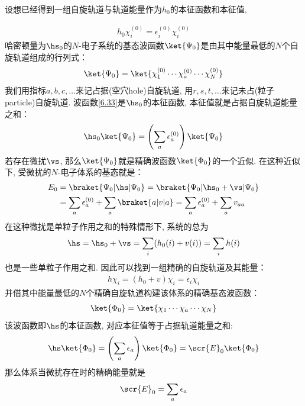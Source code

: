 设想已经得到一组自旋轨道与轨道能量作为$h_0$的本征函数和本征值,

\begin{align}
h_0\chi_i^{(0)} = \epsilon_i^{(0)} \chi_i^{(0)}
\end{align}
哈密顿量为$\hs_0$的$N$-电子系统的基态波函数$\ket{\Psi_0}$是由其中能量最低的$N$个自旋轨道组成的行列式：
\begin{align}\label{6.33}
\ket{\Psi_0} = \ket{\chi_1^{(0)}\cdots\chi_a^{(0)}\cdots\chi_N^{(0)}}
\end{align}
我们用指标$a,b,c,\ldots$来记占据(空穴hole)自旋轨道, 
用$r,s,t,\ldots$来记未占(粒子particle)自旋轨道. 
波函数\autoref{6.33}是$\hs_0$的本征函数, 
本征值就是占据自旋轨道能量之和：
\begin{align*}
\hs_0\ket{\Psi_0} = \left( \sum_a\epsilon_a^{(0)} \right)\ket{\Psi_0}
\end{align*}
若存在微扰$\vs$, 
那么$\ket{\Psi_0}$就是精确波函数$\ket{\Phi_0}$的一个近似. 
在这种近似下, 
受微扰的$N$-电子体系的基态就是：
\begin{align}\label{6.34}
E_0 & = \braket{\Psi_0|\hs|\Psi_0} = \braket{\Psi_0|\hs_0+\vs|\Psi_0}\notag\\
    & = \sum_a\epsilon_a^{(0)} + \sum_a\braket{a|v|a} = \sum_a\epsilon_a^{(0)} + \sum_av_{aa}
\end{align}
在这种微扰是单粒子作用之和的特殊情形下, 
系统的总\ha 为
\begin{align}
\hs = \hs_0 + \vs = \sum_i(h_0(i)+v(i)) = \sum_i h(i) 
\end{align}
也是一些单粒子作用之和. 
因此可以找到一组精确的自旋轨道及其能量：
\begin{align}
h\chi_i = (h_0+v)\chi_i = \epsilon_i\chi_i
\end{align}
并借其中能量最低的$N$个精确自旋轨道构建该体系的精确基态波函数：
\begin{align}
\ket{\Phi_0} = \ket{\chi_1\cdots\chi_a\cdots\chi_N}
\end{align}
该波函数即$\hs$的本征函数, 
对应本征值等于占据轨道能量之和:
\begin{align*}
\hs\ket{\Phi_0} = \left(\sum_a\epsilon_a \right)\ket{\Phi_0} = \scr{E}_0\ket{\Phi_0}
\end{align*}
那么体系当微扰存在时的精确能量就是
\begin{align}\label{6.38}
\scr{E}_0 = \sum_a\epsilon_a
\end{align}

